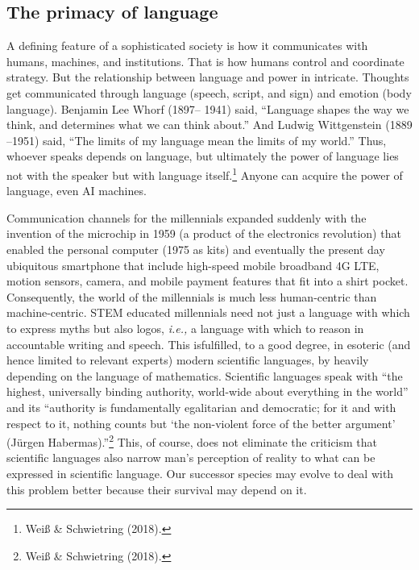 \begin{multicols}{2}
\subsection*{The primacy of language}

A defining feature of a sophisticated society is how it communicates with humans, machines, and institutions. That is how humans control and coordinate strategy. But the relationship between language and power in intricate. Thoughts get communicated through language (speech, script, and sign) and emotion (body language). Benjamin Lee Whorf (1897– 1941) said, “Language shapes the way we think, and determines what we can think about.” And Ludwig Wittgenstein (1889 –1951) said, “The limits of my language mean the limits of my world.” Thus, whoever speaks depends on language, but ultimately the power of language lies not with the speaker but with language itself.\footnote{Weiß \& Schwietring (2018).}  Anyone can acquire the power of language, even AI machines.

Communication channels for the millennials expanded suddenly with the invention of the microchip in 1959 (a product of the electronics revolution) that enabled the personal computer (1975 as kits) and eventually the present day ubiquitous smartphone that include high-speed mobile broadband 4G LTE, motion sensors, camera, and mobile payment features that fit into a shirt pocket. Consequently, the world of the millennials is much less human-centric than machine-centric. STEM educated millennials need not just a language with which to express myths but also logos, \textit{i.e.,} a language with which to reason in accountable writing and speech. This is\break fulfilled, to a good degree, in esoteric (and hence limited to relevant experts) modern scientific languages, by heavily depending on the language of mathematics. Scientific languages speak with “the highest, universally binding authority, world-wide about everything in the world” and its “authority is fundamentally egalitarian and democratic; for it and with respect to it, nothing counts but ‘the non-violent force of the better argument’ (Jürgen Habermas).”\footnote{Weiß \& Schwietring (2018).}  This, of course, does not eliminate the criticism that scientific languages also narrow man's perception of reality to what can be expressed in scientific language. Our successor species may evolve to deal with this problem better because their survival may depend on it. 


\end{multicols}
